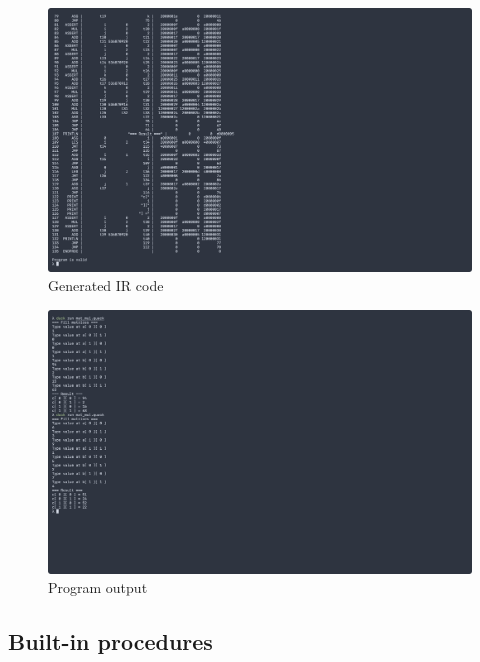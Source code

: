 \begin{figure}[H]
    \centering
    \caption{Generated IR code}
    \includegraphics[width=\textwidth]{evidences/mat_mul_ir}
\end{figure}

\begin{figure}[H]
    \centering
    \caption{Program output}
    \includegraphics[width=\textwidth]{evidences/mat_mul_output}
\end{figure}

\newpage

\subsection{Built-in procedures}

